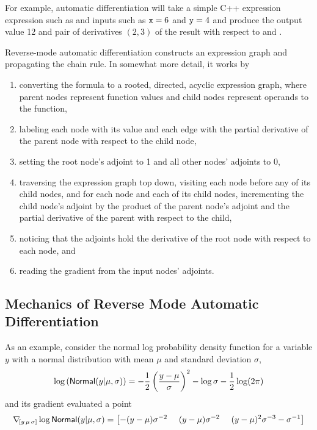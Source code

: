 \documentclass[10pt]{article}
\begin{document}
For example, automatic differentiation will take a simple C++
expression expression such as  and inputs such as
${\tt x}=6$ and ${\tt y}=4$ and produce the output value 12 and pair
of derivatives $(2,3)$ of the result with respect to  and
.  

Reverse-mode automatic differentiation constructs an expression graph
and propagating the chain rule.  In somewhat more detail, it works by
%
\begin{enumerate}
\item converting the formula to a rooted, directed, acyclic expression graph,
  where parent nodes represent function values and child nodes
  represent operands to the function,
\item labeling each node with its value and each edge with 
  the partial derivative of the parent node with respect to the child
  node, 
\item setting the root node's adjoint  to 1 and all other nodes' adjoints
  to 0, 
\item traversing the expression graph top down, visiting each node
  before any of its child nodes, and for each node and each of its
  child nodes, incrementing the child node's adjoint by the product of
  the parent node's adjoint and the partial derivative of the parent
  with respect to the child,
\item noticing that the adjoints hold the derivative of the root node
  with respect to each node, and
\item reading the gradient from the input nodes' adjoints.
\end{enumerate}
%

\subsection{Mechanics of Reverse Mode Automatic Differentiation}

As an example, consider the normal log probability density function
for a variable $y$ with a normal distribution with mean $\mu$ and
standard deviation $\sigma$,
%
\renewcommand{\theequation}{\arabic{equation}}
\begin{equation}\label{normal-log-density.equation}
\log \left( \mbox{\sf Normal}(y|\mu,\sigma) \right)
= -\frac{1}{2} \left( \frac{y - \mu}{\sigma} \right)^2
- \log \sigma
- \frac{1}{2} \log (2 \pi)
\end{equation}
%
and its gradient evaluated a point
%
\begin{equation}\label{gradient-normal-log-density.equation}
  \nabla_{\! [y \, \mu \, \sigma]} \log \distro{Normal}(y|\mu,\sigma) 
  = 
  \left[
    -(y - \mu) \sigma^{-2} \ \ \ \
    (y - \mu) \sigma^{-2} \ \ \ \ 
    (y - \mu)^2 \sigma^{-3} - \sigma^{-1}
  \right]
\end{equation}
\end{document}
